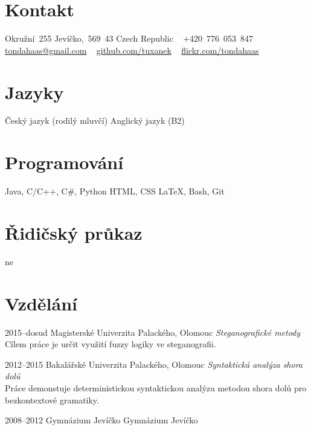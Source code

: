 \documentclass[]{friggeri-cv} %
\begin{document}


\begin{aside} %
\section{Kontakt}
Okružní~255
Jevíčko,~569~43
Czech Republic
~
+420~776~053~847
\href{mailto:tondahaas@gmail.com}{tondahaas@gmail.com}
~
\href{https://github.com/tuxanek}{github.com/tuxanek}
~
\href{https://flickr.com/tondahaas}{flickr.com/tondahaas}
\section{Jazyky}
Český jazyk (rodilý mluvčí)
Anglický jazyk (B2)
\section{Programování}
Java, C/C++, C\#, Python
HTML, CSS
LaTeX, Bash, Git
\section{Řidičský průkaz}
ne
\end{aside}


\section{Vzdělání}

\begin{entrylist}

\entry
{2015--dosud}
{Magisterské}
{Univerzita Palackého, Olomouc}
{\emph{Steganografické metody} \\ Cílem práce je určit využití fuzzy logiky ve steganografii.}

\entry
{2012--2015}
{Bakalářské}
{Univerzita Palackého, Olomouc}
{\emph{Syntaktická analýza shora dolů} \\ Práce demonstuje deterministickou syntaktickou analýzu metodou shora dolů pro bezkontextové gramatiky.}

\entry
{2008--2012}
{{\normalfont Gymnázium Jevíčko}}
{Gymnázium Jevíčko}

\end{entrylist}
\end{document}
